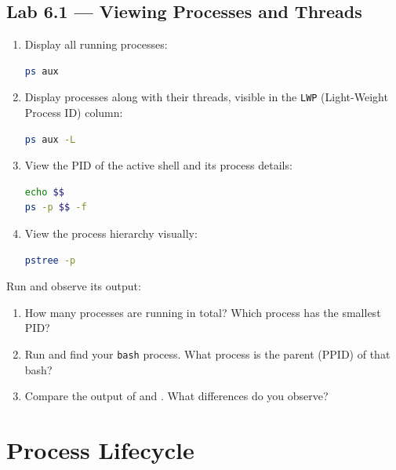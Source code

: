 \subsection*{Lab 6.1 --- Viewing Processes and Threads}

\begin{enumerate}
  \item Display all running processes:
\begin{lstlisting}[language=bash, caption={Displaying all processes}]
ps aux
\end{lstlisting}

  \item Display processes along with their threads, visible in the \texttt{LWP}
    (Light-Weight Process ID) column:
\begin{lstlisting}[language=bash, caption={Displaying processes with threads}]
ps aux -L
\end{lstlisting}

  \item View the PID of the active shell and its process details:
\begin{lstlisting}[language=bash, caption={Current shell process details}]
echo $$
ps -p $$ -f
\end{lstlisting}

  \item View the process hierarchy visually:
\begin{lstlisting}[language=bash, caption={Process tree}]
pstree -p
\end{lstlisting}
\end{enumerate}

\begin{exercisebox}[6.1]
  Run  and observe its output:
  \begin{enumerate}
    \item How many processes are running in total? Which process has the
      smallest PID?
    \item Run  and find your \texttt{bash} process. What
      process is the parent (PPID) of that bash?
    \item Compare the output of  and . What
      differences do you observe?
  \end{enumerate}
\end{exercisebox}

\section{Process Lifecycle}
\label{sec:process-lifecycle}

